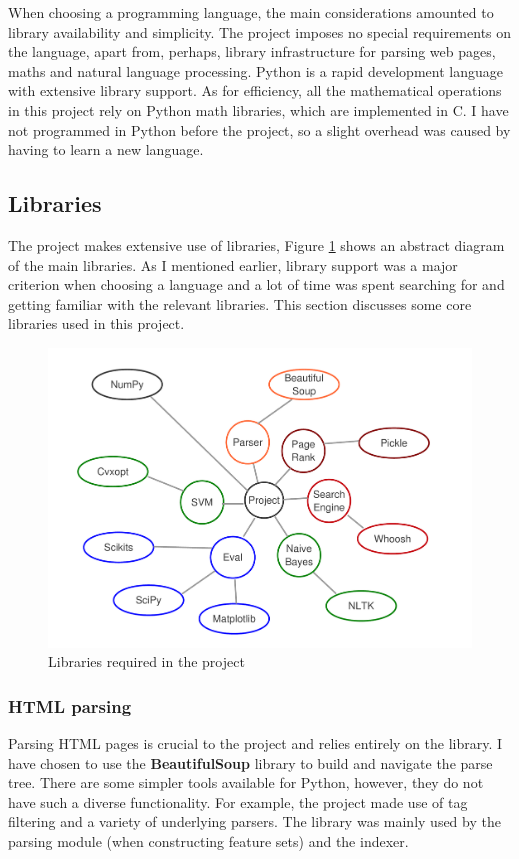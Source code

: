 \documentclass[12pt,notitlepage,twoside]{scrbook}
\begin{document}
When choosing a programming language, the main considerations amounted to library availability
and simplicity. The project imposes no special requirements on the language, apart from,
perhaps, library infrastructure for parsing web pages, maths and natural language
processing.  Python is a rapid development language with extensive library support. As for
efficiency, all the mathematical operations in this project rely on Python math libraries,
which are implemented in C. I have not programmed in Python before the project, so a
slight overhead was caused by having to learn a new language.

\subsection{Libraries}
The project makes extensive use of libraries, Figure \ref{libs} shows an abstract diagram
of the main libraries. As I mentioned earlier, library support was a major criterion when
choosing a language and a lot of time was spent searching for and getting familiar with the
relevant libraries. This section discusses some core libraries used in this project.

\begin{figure}[h]
	\centering
	\includegraphics[width=\textwidth]{figs/libs.pdf}
	\caption{Libraries required in the project\label{libs}}
\end{figure}
\subsubsection*{HTML parsing}
Parsing HTML pages is crucial to the project and relies entirely on the library. I have
chosen to use the \textbf{BeautifulSoup} library to build and navigate the parse tree.
There are some simpler tools available for Python, however, they do not have such a
diverse functionality. For example, the project made use of tag filtering and a
variety of underlying parsers. The library was mainly used by the parsing module (when
constructing feature sets) and the indexer.
\end{document}
